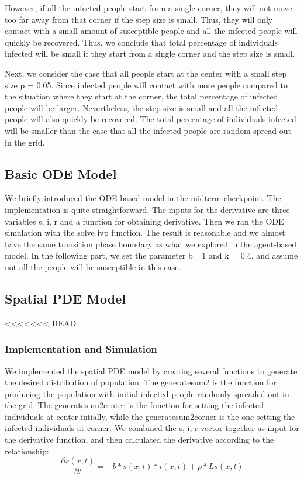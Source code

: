 \documentclass{article}
\begin{document}
However, if all the infected people start from a single corner, they will not move too far away from that corner if the step size is small. Thus, they will only contact with a small amount of susceptible people and all the infected people will quickly be recovered. Thus, we conclude that total percentage of individuals infected will be small if they start from a single corner and the step size is small.


Next, we consider the case that all people start at the center with a small step size p = 0.05. Since infected people will contact with more people compared to the situation where they start at the corner, the total percentage of infected people will be larger. Nevertheless, the step size is small and all the infected people will also quickly be recovered. The total percentage of individuals infected will be smaller than the case that all the infected people are random spread out in the grid. 






\subsection{Basic ODE Model}

We briefly introduced the ODE based model in the midterm checkpoint. The implementation is quite straightforward. The inputs for the derivative are three variables s, i, r and a function for obtaining derivative. Then we ran the ODE simulation with the solve ivp function. The result is reasonable and we almost have the same transition phase boundary as what we explored in the agent-based model. In the following part, we set the parameter b =1 and k = 0.4, and assume not all the people will be susceptible in this case. 



\subsection{Spatial PDE Model}
<<<<<<< HEAD

\subsubsection{Implementation and Simulation}

We implemented the spatial PDE model by creating several functions to generate the desired distribution of population. The generatesum2 is the function for producing the population with initial infected people randomly spreaded out in the grid. The generatesum2center is the function for setting the infected individuals at center intially, while the generatesum2corner is the one setting the infected individuals at corner. We combined the s, i, r vector together as input for the derivative function, and then calculated the derivative according to the relationship: 
$$\frac{\partial s(x,t)}{\partial t} = - b*s(x,t)*i(x,t) + p *L  s(x,t)$$
\end{document}
